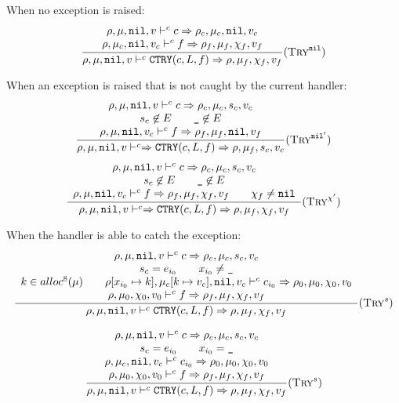 When no exception is raised:
\[\dfrac{\begin{array}{c}
    \rho,\mu,\texttt{nil},v \vdash^c c \Rightarrow \rho_c,\mu_c,\texttt{nil},v_c \\
    \rho,\mu_c,\texttt{nil},v_c \vdash^c f \Rightarrow \rho_f,\mu_f,\chi_f,v_f
\end{array}}{\rho,\mu,\texttt{nil},v \vdash^c \texttt{CTRY}(c, L, f) \Rightarrow \rho,\mu_f,\chi_f,v_f} (\textsc{Try}^{\texttt{nil}})\]

When an exception is raised that is not caught by the current handler:
\[\dfrac{\begin{array}{c}
    \rho,\mu,\texttt{nil},v \vdash^c c \Rightarrow \rho_c,\mu_c,s_c,v_c \\
    s_c \not\in E \qquad \texttt{\_}\not\in E \\
    \rho,\mu,\texttt{nil},v_c \vdash^c f \Rightarrow \rho_f,\mu_f,\texttt{nil},v_f
\end{array}}{\rho,\mu,\texttt{nil},v \vdash^c \Rightarrow \texttt{CTRY}(c, L, f) \Rightarrow \rho,\mu_f,s_c,v_c} (\textsc{Try}^{\texttt{nil}'})\]
\[\dfrac{\begin{array}{c}
    \rho,\mu,\texttt{nil},v \vdash^c c \Rightarrow \rho_c,\mu_c,s_c,v_c \\
    s_c \not\in E \qquad \texttt{\_}\not\in E \\
    \rho,\mu,\texttt{nil},v_c \vdash^c f \Rightarrow \rho_f,\mu_f,\chi_f,v_f \qquad \chi_f\ne\texttt{nil}
\end{array}}{\rho,\mu,\texttt{nil},v \vdash^c \Rightarrow \texttt{CTRY}(c, L, f) \Rightarrow \rho,\mu_f,\chi_f,v_f} (\textsc{Try}^{\chi'})\]

When the handler is able to catch the exception:
\[\dfrac{\begin{array}{c}
    \rho,\mu,\texttt{nil},v \vdash^c c \Rightarrow \rho_c,\mu_c,s_c,v_c \\
    s_c = e_{i_0} \qquad x_{i_0} \ne \texttt{\_} \\
    k\in alloc^8(\mu) \qquad \rho[x_{i_0}\mapsto k],\mu_c[k\mapsto v_c],\texttt{nil},v_c \vdash^c c_{i_0} \Rightarrow \rho_0,\mu_0,\chi_0,v_0 \\
    \rho,\mu_0,\chi_0,v_0 \vdash^c f \Rightarrow \rho_f,\mu_f,\chi_f,v_f
\end{array}}{\rho,\mu,\texttt{nil},v \vdash^c \texttt{CTRY}(c, L, f) \Rightarrow \rho,\mu_f,\chi_f,v_f} (\textsc{Try}^s)\]

\[\dfrac{\begin{array}{c}
    \rho,\mu,\texttt{nil},v \vdash^c c \Rightarrow \rho_c,\mu_c,s_c,v_c \\
    s_c = e_{i_0} \qquad x_{i_0} = \texttt{\_} \\
    \rho,\mu_c,\texttt{nil},v_c \vdash^c c_{i_0} \Rightarrow \rho_0,\mu_0,\chi_0,v_0 \\
    \rho,\mu_0,\chi_0,v_0 \vdash^c f \Rightarrow \rho_f,\mu_f,\chi_f,v_f
\end{array}}{\rho,\mu,\texttt{nil},v \vdash^c \texttt{CTRY}(c, L, f) \Rightarrow \rho,\mu_f,\chi_f,v_f} (\textsc{Try}^s)\]

